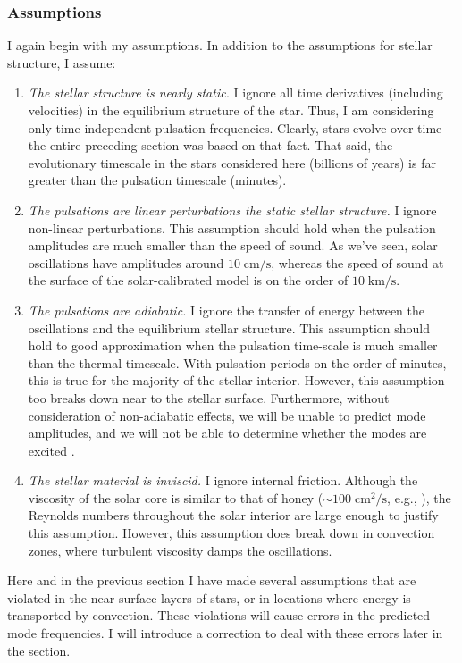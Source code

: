 \subsubsection*{Assumptions} 

I again begin with my assumptions. In addition to the assumptions for stellar structure, I assume: 

\begin{enumerate} 
    \item \emph{The stellar structure is nearly static.} 
    I ignore all time derivatives (including velocities) in the equilibrium structure of the star. 
    Thus, I am considering only time-independent pulsation frequencies. 
    Clearly, stars evolve over time---the entire preceding section was based on that fact. 
    That said, the evolutionary timescale in the stars considered here (billions of years) is far greater than the pulsation timescale (minutes). 
    
    \item \emph{The pulsations are linear perturbations the static stellar structure.} 
    I ignore non-linear perturbations. %
    This assumption should hold when the pulsation amplitudes are much smaller than the speed of sound. 
    As we've seen, solar oscillations have amplitudes around ${10\;\text{cm/s}}$, whereas the speed of sound at the surface of the solar-calibrated model is on the order of ${10\;\text{km/s}}$. 
    
    \item \emph{The pulsations are adiabatic.} 
    I ignore the transfer of energy between the oscillations and the equilibrium stellar structure. 
    This assumption should hold to good approximation when the pulsation time-scale is much smaller than the thermal timescale. 
    With pulsation periods on the order of minutes, this is true for the majority of the stellar interior.
    However, this assumption too breaks down near to the stellar surface. 
    Furthermore, without consideration of non-adiabatic effects, we will be unable to predict mode amplitudes, and we will not be able to determine whether the modes are excited \citep[e.g.,][]{2015EAS....73..111S}. 
    
    \item \emph{The stellar material is inviscid.} 
    I ignore internal friction. 
    Although the viscosity of the solar core is similar to that of honey (${\sim 100\;\text{cm}^2/\text{s}}$, e.g., \citealt{fox2000geophysical}), the Reynolds numbers throughout the solar interior are large enough to justify this assumption. %
    However, this assumption does break down in convection zones, where turbulent viscosity damps the oscillations. 
\end{enumerate} 
Here and in the previous section I have made several assumptions that are violated in the near-surface layers of stars, or in locations where energy is transported by convection. 
These violations will cause errors in the predicted mode frequencies. 
I will introduce a correction to deal with these errors later in the section. 

